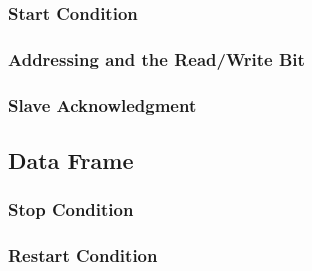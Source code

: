 \documentclass[11pt,fleqn]{book} %
\begin{document}
        \subsubsection{Start Condition}
        \subsubsection{Addressing and the Read/Write Bit}
        \subsubsection{Slave Acknowledgment}
    \subsection{Data Frame}
        \subsubsection{Stop Condition}
        \subsubsection{Restart Condition}
\end{document}

